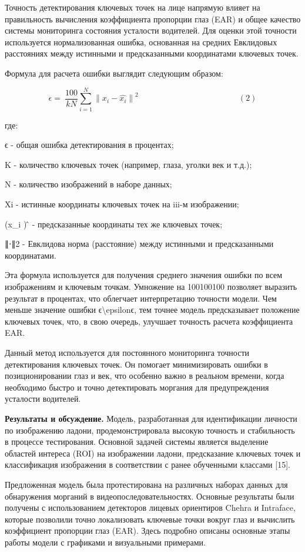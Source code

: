 \documentclass[
]{article}
\begin{document}
Точность детектирования ключевых точек на лице напрямую влияет на
правильность вычисления коэффициента пропорции глаз (EAR) и общее
качество системы мониторинга состояния усталости водителей. Для оценки
этой точности используется нормализованная ошибка, основанная на средних
Евклидовых расстояниях между истинными и предсказанными координатами
ключевых точек.

Формула для расчета ошибки выглядит следующим образом:

\[\epsilon = \ \frac{100}{kN}\sum_{i = 1}^{N}{\parallel x_{i} - \widehat{x_{i}} \parallel}^{2}\ \ \ \ \ \ \ \ \ \ \ \ \ \ \ \ \ \ \ \ \ \ \ \ \ \ \ \ \ \ \ \ \ \ \ \ \ \ \ \ \ \ \ \ \ \ \ \ \ \ \ \ \ \ \ (2)\]

где:

ϵ - общая ошибка детектирования в процентах;

Κ - количество ключевых точек (например, глаза, уголки век и т.д.);

N - количество изображений в наборе данных;

Xi - истинные координаты ключевых точек на iii-м изображении;

(x\_i ) ̂ - предсказанные координаты тех же ключевых точек;

∥⋅∥2 - Евклидова норма (расстояние) между истинными и предсказанными
координатами.

Эта формула используется для получения среднего значения ошибки по всем
изображениям и ключевым точкам. Умножение на 100100100 позволяет
выразить результат в процентах, что облегчает интерпретацию точности
модели. Чем меньше значение ошибки ϵ\textbackslash epsilonϵ, тем точнее
модель предсказывает положение ключевых точек, что, в свою очередь,
улучшает точность расчета коэффициента EAR.

Данный метод используется для постоянного мониторинга точности
детектирования ключевых точек. Он помогает минимизировать ошибки в
позиционировании глаз и век, что особенно важно в реальном времени,
когда необходимо быстро и точно детектировать моргания для
предупреждения усталости водителей.

\textbf{Результаты и обсуждение.} Модель, разработанная для
идентификации личности по изображению ладони, продемонстрировала высокую
точность и стабильность в процессе тестирования. Основной задачей
системы является выделение областей интереса (ROI) на изображении
ладони, предсказание ключевых точек и классификация изображения в
соответствии с ранее обученными классами {[}15{]}.

Предложенная модель была протестирована на различных наборах данных для
обнаружения морганий в видеопоследовательностях. Основные результаты
были получены с использованием детекторов лицевых ориентиров Chehra и
Intraface, которые позволили точно локализовать ключевые точки вокруг
глаз и вычислить коэффициент пропорции глаз (EAR). Здесь подробно
описаны основные этапы работы модели с графиками и визуальными
примерами.
\end{document}
